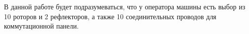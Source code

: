 %	
%
%


В данной работе будет подразумеваться, что у оператора машины есть выбор из 10 роторов и 2 рефлекторов, а также 10 соединительных проводов для коммутационной панели.

